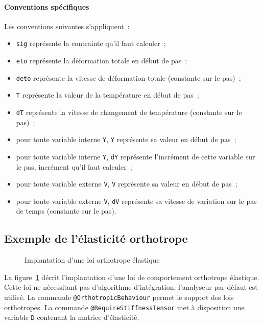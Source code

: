 \documentclass[rectoverso,pleiades,pstricks,leqno,anti]{texmf/note_technique_2010}
\newcommand{\code}[1]{
  \psframebox[linecolor=ceaorange,shadow=true,blur=true]{
    \begin{minipage}[htbp]{1.0\linewidth}
      \ttfamily\scriptsize #1
    \end{minipage}
  }
}
\begin{document}
\paragraph{Conventions spécifiques} Les conventions suivantes
s'appliquent~:
\begin{itemize}
  \item {\tt sig} représente la contrainte qu'il faut calculer~;
  \item {\tt eto} représente la déformation totale en début de pas~;
  \item {\tt deto} représente la vitesse de déformation totale
  (constante sur le pas)~;
  \item {\tt T} représente la valeur de la température en début de pas~;
  \item {\tt dT} représente la vitesse de changement de température
  (constante sur le pas)~;
  \item pour toute variable interne {\tt Y}, {\tt Y} représente sa
  valeur en début de pas~;
  \item pour toute variable interne {\tt Y}, {\tt dY} représente
  l'incrément de cette variable sur le pas, incrément qu'il faut
  calculer~;
  \item pour toute variable externe {\tt V}, {\tt V} représente sa
  valeur en début de pas~;
  \item pour toute variable externe {\tt V}, {\tt dV} représente sa
  vitesse de variation sur le pas de temps (constante sur le pas).
\end{itemize}

\subsection{Exemple de l'élasticité orthotrope}

\begin{figure}[htbp]
  \centering
  \begin{minipage}[htbp]{0.9\linewidth}
    \shorthandoff{:}
    \code{
      \small
      
    }
    \shorthandon{:}
  \end{minipage}
  \caption{Implantation d'une loi orthotrope élastique}
  \label{fig:OrthoElastique}
\end{figure}

La figure~\ref{fig:OrthoElastique} décrit l'implantation d'une loi de
comportement orthotrope élastique. Cette loi ne nécessitant pas
d'algorithme d'intégration, l'analyseur par défaut est utilisé. La
commande \texttt{@Orthotropic\-Behaviour} permet le support des lois
orthotropes. La commande \texttt{@Require\-Stiff\-ness\-Tensor} met à
disposition une variable {\tt D} contenant la matrice d'élasticité.
\end{document}
